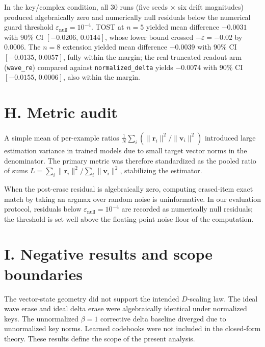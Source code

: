 \documentclass[11pt,a4paper]{article}
\begin{document}
In the key/complex condition, all 30 runs (five seeds $\times$ six drift magnitudes) produced algebraically zero and numerically null residuals below the numerical guard threshold $\varepsilon_{\text{null}} = 10^{-4}$. TOST at $n=5$ yielded mean difference $-0.0031$ with $90\%$ CI $[-0.0206,\,0.0144]$, whose lower bound crossed $-\varepsilon=-0.02$ by $0.0006$. The $n=8$ extension yielded mean difference $-0.0039$ with $90\%$ CI $[-0.0135,\,0.0057]$, fully within the margin; the real-truncated readout arm (\texttt{wave\_re}) compared against \texttt{normalized\_delta} yields $-0.0074$ with $90\%$ CI $[-0.0155,\,0.0006]$, also within the margin.

\section{H. Metric audit}\label{sec:H}

A simple mean of per-example ratios $\frac{1}{N}\sum_i (\|\mathbf{r}_i\|^2 / \|\mathbf{v}_i\|^2)$ introduced large estimation variance in trained models due to small target vector norms in the denominator. The primary metric was therefore standardized as the pooled ratio of sums $L = \sum_i \|\mathbf{r}_i\|^2 / \sum_i \|\mathbf{v}_i\|^2$, stabilizing the estimator.

When the post-erase residual is algebraically zero, computing erased-item exact match by taking an argmax over random noise is uninformative. In our evaluation protocol, residuals below $\varepsilon_{\text{null}} = 10^{-4}$ are recorded as numerically null residuals; the threshold is set well above the floating-point noise floor of the computation.

\section{I. Negative results and scope boundaries}\label{sec:I}

The vector-state geometry did not support the intended $D$-scaling law. The ideal wave erase and ideal delta erase were algebraically identical under normalized keys. The unnormalized $\beta=1$ corrective delta baseline diverged due to unnormalized key norms. Learned codebooks were not included in the closed-form theory. These results define the scope of the present analysis.



\end{document}
